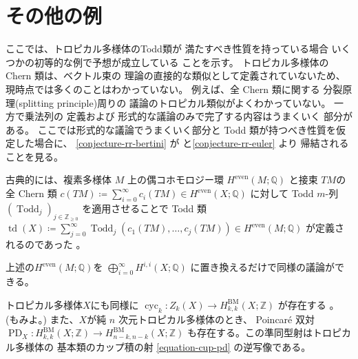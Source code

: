 \documentclass[a4paper,dvipdfmx,reqno,12pt]{amsart}
\theoremstyle{definition}
\newcommand{\deq}{\coloneqq}
\newcommand{\opn}[1]{\operatorname{#1}}
\numberwithin{equation}{section}
\begin{document}
\section{その他の例}

ここでは、トロピカル多様体のTodd類が
満たすべき性質を持っている場合
いくつかの初等的な例で予想が成立している
ことを示す。
トロピカル多様体の Chern 類は、ベクトル束の
理論の直接的な類似として定義されていないため、
現時点では多くのことはわかっていない。
例えば、全 Chern 類に関する
分裂原理(splitting principle)周りの
議論のトロピカル類似がよくわかっていない。
一方で乗法列\cite[]{MR1335917}の
定義および
形式的な議論のみで完了する内容はうまくいく
部分がある。
ここでは形式的な議論でうまくいく部分と
Todd 類が持つべき性質を仮定した場合に、
\cref{conjecture-rr-bertini} 
が\cite[Conjecture 6.13]{demedrano2023chern}
と\cref{conjecture-rr-euler} より
帰結されることを見る。

古典的には、複素多様体 $M$ 上の偶コホモロジー環
$H^{\mathrm{even}}(M;\mathbb{Q})$
と接束 $TM$の全 Chern 類 
$c(TM)\deq \sum_{i=0}^{\infty}c_i(TM)\in 
H^{\mathrm{even}}(X;\mathbb{Q})$
に対して
Todd $m$-列 $(\opn{Todd}_j)_{j\in \mathbb{Z}_{\geq 0}}$
を適用させることで Todd 類
$\opn{td}(X)\deq \sum_{j=0}^{\infty}
\opn{Todd}_j(c_1(TM),\ldots,c_j(TM))\in 
H^{\mathrm{even}}(M;\mathbb{Q})$
が定義されるのであった
\cite[]{MR1335917}。

上述の$H^{\mathrm{even}}(M;\mathbb{Q})$を
$\bigoplus_{i=0}^{\infty} H^{i,i}(X;\mathbb{Q})$
に置き換えるだけで同様の議論ができる。

トロピカル多様体$X$にも同様に
$\opn{cyc}_k\colon Z_k(X)\to H^{\mathrm{BM}}_{k,k}(X;\mathbb{Z})$
が存在する
\cite{gross2019sheaftheoretic}。
(\cite[Definition 4.13]{MR3894860}もみよ。)
また、$X$が純 $n$ 次元トロピカル多様体のとき、
Poincar\'e 双対
$\opn{PD}_X\colon H_{k,k}^{\opn{BM}}(X;\mathbb{Z})
\to H_{n-k,n-k}^{\opn{BM}}(X;\mathbb{Z})$
も存在する。この準同型射はトロピカル多様体の
基本類のカップ積の射 \eqref{equation-cup-pd}
の逆写像である。
\end{document}
